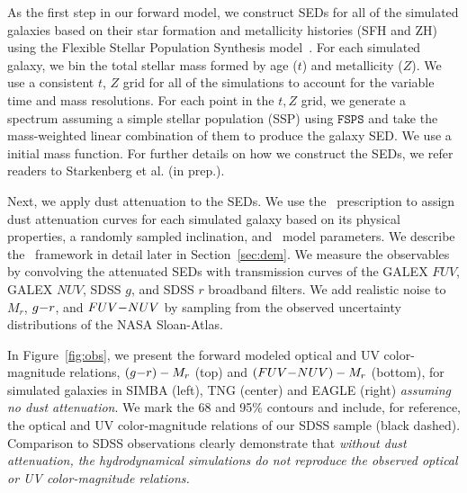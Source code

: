 As the first step in our forward model, we construct SEDs for all
of the simulated galaxies based on their star formation and metallicity
histories (SFH and ZH) using the Flexible Stellar Population Synthesis
model~\citep[$\mathtt{FSPS}$;][]{conroy2009, conroy2010}. For each simulated
galaxy, we bin the total stellar mass formed by age ($t$) and metallicity
($Z$). We use a consistent $t$, $Z$ grid for all of the simulations
to account for the variable time and mass resolutions. For each point in the
$t, Z$ grid, we generate a spectrum assuming a simple stellar population (SSP)
using $\mathtt{FSPS}$ and take the mass-weighted linear combination of them to
produce the galaxy SED. We use a
\cite{chabrier2003} initial mass function. For further details on how we
construct the SEDs, we refer readers to Starkenberg et al. (in prep.).

Next, we apply dust attenuation to the SEDs. We use the \eda~prescription
to assign dust attenuation curves for each simulated galaxy based on its physical
properties, a randomly sampled inclination, and \eda~model parameters. We
describe the \eda~framework in detail later in Section~\ref{sec:dem}. We
measure the observables by convolving the attenuated SEDs with transmission
curves of the GALEX $FUV$, GALEX $NUV$, SDSS $g$, and SDSS $r$ broadband
filters. We add realistic noise to $M_r$, $g{-}r$, and $FUV{-}NUV$ by sampling
from the observed uncertainty distributions of the NASA Sloan-Atlas.

In Figure~\ref{fig:obs}, we present the forward modeled optical and UV
color-magnitude relations, $(g{-}r)-M_r$ (top) and $(FUV{-}NUV)-M_r$ (bottom),
for simulated galaxies in SIMBA (left), TNG (center) and EAGLE (right)
\emph{assuming no dust attenuation}. We mark the 68 and 95\% contours and
include, for reference, the optical and UV color-magnitude relations of our
SDSS sample (black dashed). 
Comparison to SDSS observations clearly demonstrate
that {\em without dust attenuation, the hydrodynamical simulations do not
reproduce the observed optical or UV color-magnitude relations.}

